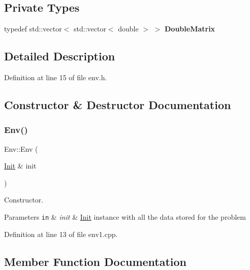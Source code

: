 \subsection*{Private Types}
\begin{DoxyCompactItemize}
\item 
\mbox{\label{class_env_a6ab9738ed0a4e1d69e432ca2da48fa3c}} 
typedef std\+::vector$<$ std\+::vector$<$ double $>$ $>$ {\bfseries Double\+Matrix}
\end{DoxyCompactItemize}


\subsection{Detailed Description}


Definition at line 15 of file env.\+h.



\subsection{Constructor \& Destructor Documentation}
\mbox{\label{class_env_abef807205f56ffe87706b5413c0de75f}} 
\subsubsection{\texorpdfstring{Env()}{Env()}}
{\footnotesize\ttfamily Env\+::\+Env (\begin{DoxyParamCaption}\item[{\hyperlink{class_init}{Init} \&}]{init }\end{DoxyParamCaption})}



Constructor. 


\begin{DoxyParams}[1]{Parameters}
\mbox{\tt in}  & {\em init} & \hyperlink{class_init}{Init} instance with all the data stored for the problem \\
\hline
\end{DoxyParams}


Definition at line 13 of file env1.\+cpp.



\subsection{Member Function Documentation}
\mbox{\label{class_env_a05decf6ad0f2370b38fd8c403777a9ca}} 
